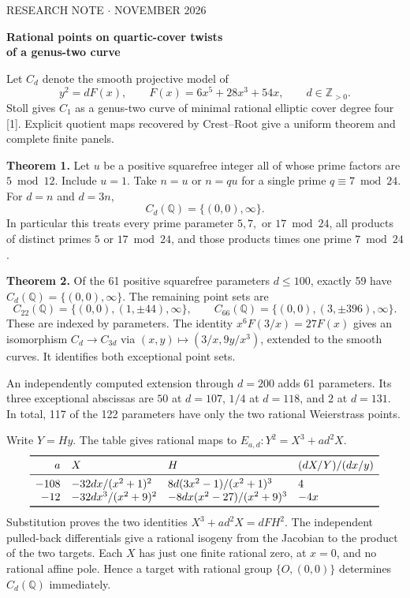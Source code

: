 \documentclass[12pt]{article}
\newcommand{\Q}{\mathbb Q}\newcommand{\Z}{\mathbb Z}
\newcommand{\sub}[1]{\par\smallskip{\bfseries\color{green}#1}\par}
\begin{document}
{\small\sffamily\color{green} RESEARCH NOTE \quad $\cdot$  NOVEMBER 2026}\par
{\LARGE\bfseries\color{ink} Rational points on quartic-cover twists\\of a genus-two curve}\par
\medskip
Let $C_d$ denote the smooth projective model of
\[
 y^2=dF(x),\qquad F(x)=6x^5+28x^3+54x,\qquad d\in\Z_{>0}.
\]
Stoll gives $C_1$ as a genus-two curve of minimal rational elliptic cover degree four [1]. Explicit quotient maps recovered by Crest--Root give a uniform theorem and complete finite panels.

\textbf{Theorem 1.} Let $u$ be a positive squarefree integer all of whose prime factors are $5\bmod 12$. Include $u=1$. Take $n=u$ or $n=qu$ for a single prime $q\equiv7\bmod24$. For $d=n$ and $d=3n$,
\[
 C_d(\Q)=\{(0,0),\infty\}.
\]
In particular this treats every prime parameter $5,7,$ or $17\bmod24$, all products of distinct primes $5$ or $17\bmod24$, and those products times one prime $7\bmod24$.

\textbf{Theorem 2.} Of the 61 positive squarefree parameters $d\le100$, exactly 59 have $C_d(\Q)=\{(0,0),\infty\}$. The remaining point sets are
\[
 C_{22}(\Q)=\{(0,0),(1,\pm44),\infty\},\qquad
 C_{66}(\Q)=\{(0,0),(3,\pm396),\infty\}.
\]
These are indexed by parameters. The identity $x^6 F(3/x)=27F(x)$ gives an isomorphism $C_d\longrightarrow C_{3d}$ via $(x,y)\mapsto(3/x,9y/x^3)$, extended to the smooth curves. It identifies both exceptional point sets.

An independently computed extension through $d=200$ adds 61 parameters. Its three exceptional abscissas are $50$ at $d=107$, $1/4$ at $d=118$, and $2$ at $d=131$. In total, 117 of the 122 parameters have only the two rational Weierstrass points.

\sub{The two elliptic quotients}
Write $Y=Hy$. The table gives rational maps to $E_{a,d}:Y^2=X^3+ad^2X$.
\[
\begin{array}{rlll}
\toprule
a & X & H & (dX/Y)/(dx/y)\\ \midrule
-108 & -32dx/(x^2+1)^2 & 8d(3x^2-1)/(x^2+1)^3 &4\\
-12 & -32dx^3/(x^2+9)^2 & -8dx(x^2-27)/(x^2+9)^3 & -4x\\
\bottomrule
\end{array}
\]
Substitution proves the two identities $X^3+ad^2X=dF H^2$. The independent pulled-back differentials give a rational isogeny from the Jacobian to the product of the two targets. Each $X$ has just one finite rational zero, at $x=0$, and no rational affine pole. Hence a target with rational group $\{O,(0,0)\}$ determines $C_d(\Q)$ immediately.
\end{document}
